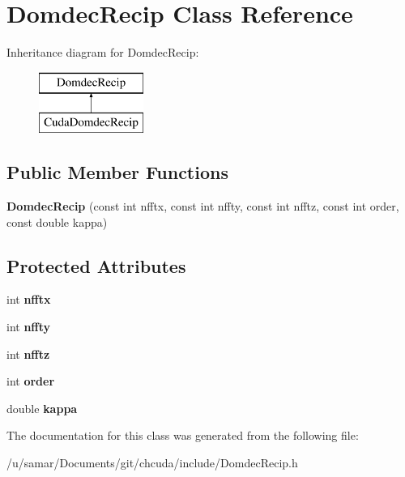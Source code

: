 \hypertarget{classDomdecRecip}{}\section{Domdec\+Recip Class Reference}
\label{classDomdecRecip}
Inheritance diagram for Domdec\+Recip\+:\begin{figure}[H]
\begin{center}
\leavevmode
\includegraphics[height=2.000000cm]{classDomdecRecip}
\end{center}
\end{figure}
\subsection*{Public Member Functions}
\begin{DoxyCompactItemize}
\item 
\hypertarget{classDomdecRecip_a615297bad8615e487e032724af9e5f71}{}\label{classDomdecRecip_a615297bad8615e487e032724af9e5f71} 
{\bfseries Domdec\+Recip} (const int nfftx, const int nffty, const int nfftz, const int order, const double kappa)
\end{DoxyCompactItemize}
\subsection*{Protected Attributes}
\begin{DoxyCompactItemize}
\item 
\hypertarget{classDomdecRecip_a4c285af461282131d49ce72d35a85f42}{}\label{classDomdecRecip_a4c285af461282131d49ce72d35a85f42} 
int {\bfseries nfftx}
\item 
\hypertarget{classDomdecRecip_a7238cf29a27789310b2cefd4322d1fcb}{}\label{classDomdecRecip_a7238cf29a27789310b2cefd4322d1fcb} 
int {\bfseries nffty}
\item 
\hypertarget{classDomdecRecip_a87ae46c2f9f767aa5ae862a539be0454}{}\label{classDomdecRecip_a87ae46c2f9f767aa5ae862a539be0454} 
int {\bfseries nfftz}
\item 
\hypertarget{classDomdecRecip_afc932b2f968be556fb3685f9632e07fe}{}\label{classDomdecRecip_afc932b2f968be556fb3685f9632e07fe} 
int {\bfseries order}
\item 
\hypertarget{classDomdecRecip_a6169ef7da01efe0f6058cc8b0ad7985f}{}\label{classDomdecRecip_a6169ef7da01efe0f6058cc8b0ad7985f} 
double {\bfseries kappa}
\end{DoxyCompactItemize}


The documentation for this class was generated from the following file\+:\begin{DoxyCompactItemize}
\item 
/u/samar/\+Documents/git/chcuda/include/Domdec\+Recip.\+h\end{DoxyCompactItemize}
